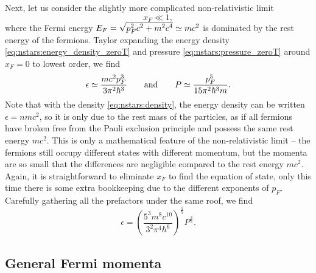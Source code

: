 Next, let us consider the slightly more complicated non-relativistic limit
\begin{equation}
	x_F \ll 1,
\label{eq:nstars:nr_limit}
\end{equation}
where the Fermi energy $E_F = \sqrt{\smash[b]{p_F^2 c^2 + m^2 c^4}} \simeq m c^2$ is dominated by the rest energy of the fermions.
Taylor expanding the energy density \eqref{eq:nstars:energy_density_zeroT} and pressure \eqref{eq:nstars:pressure_zeroT} around $x_F = 0$ to lowest order, we find
\begin{equation}
	\epsilon \simeq \frac{m c^2 p_F^3}{3 \pi^2 \hbar^3}
	\qquad \text{and} \qquad
	P        \simeq \frac{p_F^5}{15 \pi^2 \hbar^3 m} .
\end{equation}
Note that with the density \eqref{eq:nstars:density}, the energy density can be written $\epsilon = n m c^2$, so it is only due to the rest mass of the particles, as if all fermions have broken free from the Pauli exclusion principle and possess the same rest energy $m c^2$.
This is only a mathematical feature of the non-relativistic limit -- the fermions still occupy different states with different momentum, but the momenta are so small that the differences are negligible compared to the rest energy $mc^2$.
Again, it is straightforward to eliminate $x_F$ to find the equation of state, only this time there is some extra bookkeeping due to the different exponents of $p_F$.
Carefully gathering all the prefactors under the same roof, we find
\begin{equation}
	\epsilon = \left( \frac{5^3 m^8 c^{10}}{3^2 \pi^4 \hbar^6} \right)^{\frac15}  P^{\frac35} .
\label{eq:nstars:nr_eos}
\end{equation}

\iffalse
Dimensionless equation of state
\begin{equation}
	\diml{\epsilon} = \left[ \frac{4^2 5^3}{3^4 \pi^2} \frac{m^8 c^6 r_0^6}{m_0^2 \hbar^6} \diml{P}^3 \right]^{\frac{1}{5}}
\end{equation}
\fi

\subsection{General Fermi momenta}
\label{sec:nstars:gr_limit}


